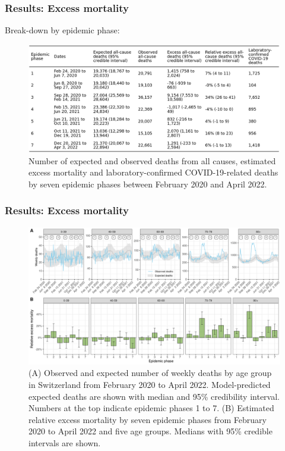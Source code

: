 \documentclass[10pt]{beamer}
\begin{document}
\begin{frame}
	\frametitle{Results: Excess mortality}
	Break-down by \alert{epidemic phase}:
	\begin{figure}[t]
		\includegraphics[width=\linewidth ]{figures/table1.png}
		\caption{Number of expected and observed deaths from all causes, estimated excess mortality and laboratory-confirmed COVID-19-related deaths by seven epidemic phases between February 2020 and April 2022.}
	\end{figure}
\end{frame}


\begin{frame}
\frametitle{Results: Excess mortality}
\begin{figure}[t]
	\includegraphics[width=\linewidth ]{figures/fig1.png}
	\caption{(A) Observed and expected number of weekly deaths by age group in Switzerland from February 2020 to April 2022. Model-predicted expected deaths are shown with median and 95\% credibility interval. Numbers at the top indicate epidemic phases 1 to 7. (B) Estimated relative excess mortality by seven epidemic phases from February 2020 to April 2022 and five age groups. Medians with 95\% credible intervals are shown.}
\end{figure}
\end{frame}
\end{document}
